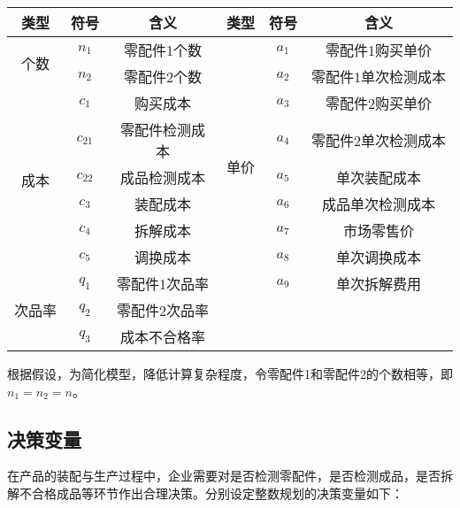 \documentclass[withoutpreface,bwprint]{cumcmthesis} %
\begin{document}
\begin{table}[htbp]
		\centering
	\begin{tabular}{ccc|ccc}
		\toprule[1.5pt]
		类型                   & 符号  & 含义      & 类型                  & 符号 & 含义       \\ \hline
		\multirow{2}{*}{个数}  & $n_1$  & 零配件1个数  & \multirow{9}{*}{单价} & $a_1$ & 零配件1购买单价 \\
		& $n_2$  & 零配件2个数  &                     & $a_2$ & 零配件1单次检测成本 \\ \cline{1-3}
		\multirow{6}{*}{成本}  & $c_1$  & 购买成本    &                     & $a_3$ & 零配件2购买单价 \\
		& $c_{21}$ & 零配件检测成本 &                     & $a_4$ & 零配件2单次检测成本 \\
		& $c_{22}$ & 成品检测成本  &                     & $a_5$ & 单次装配成本     \\
		& $c_3$  & 装配成本    &                     & $a_6$ & 成品单次检测成本   \\
		& $c_4$  & 拆解成本    &                     & $a_7$ & 市场零售价   \\
		& $c_5$  & 调换成本    &                     & $a_8$ & 单次调换成本   \\ \cline{1-3}
		\multirow{3}{*}{次品率} & $q_1$  & 零配件1次品率 &                     & $a_9$ & 单次拆解费用   \\  
		& $q_2$  & 零配件2次品率 &                     &    &          \\
		& $q_3$  & 成本不合格率  &                     &    &          \\ \bottomrule[1.5pt]
	\end{tabular}
\end{table}

根据假设，为简化模型，降低计算复杂程度，令零配件1和零配件2的个数相等，即$n_1=n_2=n$。

\subsection{决策变量}
在产品的装配与生产过程中，企业需要对是否检测零配件，是否检测成品，是否拆解不合格成品等环节作出合理决策。分别设定整数规划的决策变量如下：
\end{document}
